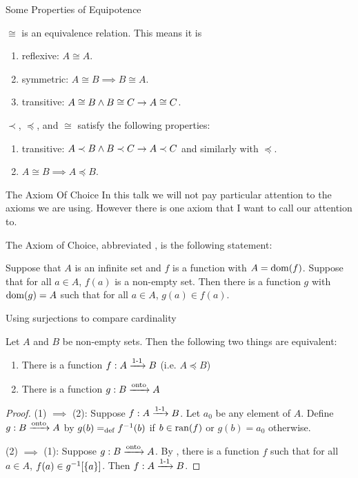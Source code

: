 \documentclass[pdf,final]{prosper}
\newcommand{\skipsmall}{\vspace{1em}}
\newcommand{\skipmed}{\vspace{2em}}
\begin{document}
\begin{slide}{Some Properties of Equipotence}
\begin{exercise}
$\cong$ is an equivalence relation. This means it is
\begin{enumerate}
  \item reflexive: $A\cong A$.
  \item symmetric: $A\cong B\implies B\cong A$.
  \item transitive: $A\cong B \wedge B\cong C \rightarrow A\cong C$.
\end{enumerate}
\end{exercise}

\skipmed

\begin{exercise}
$\prec$, $\preceq$, and $\cong$ satisfy the following properties:
\begin{enumerate}
  \item transitive: $A\prec B \wedge B\prec C \rightarrow A\prec C$ and similarly with
  $\preceq$.
  \item $A\cong B \implies A\preceq B$.
\end{enumerate}
\end{exercise}
\end{slide}

\begin{slide}{The Axiom Of Choice}
In this talk we will not pay particular attention to the axioms we are using.
However there is one axiom that I want to call our attention to.

\skipmed

The Axiom of Choice, abbreviated \AC, is the following statement:

\skipsmall

Suppose that $A$ is an infinite set and $f$ is a function with $A=\operatorname{dom}(f)$.
Suppose that for all $a\in A$, $f(a)$ is a non-empty set. Then there is a
function $g$ with $\operatorname{dom}(g)=A$ such that for all $a \in A$,  $g(a)\in f(a)$.
\end{slide}

\begin{slide}{Using surjections to compare cardinality}
\begin{lemma}
Let $A$ and $B$ be non-empty sets. Then the following two things are equivalent:
\begin{enumerate}
\item There is a function $f:A \xrightarrow{\text{1-1}} B$ (i.e. $A\preceq B$)
\item There is a function $g:B \xrightarrow{\text{onto}} A$
\end{enumerate}
\end{lemma}

\skipsmall

\begin{proof}
(1) $\implies$ (2): Suppose $f:A \xrightarrow{\text{1-1}} B$. Let $a_0$ be any element of $A$.
Define $g:B\xrightarrow{\text{onto}} A$ by $g(b)=_{\text{def}} f^{-1}(b)$ if $b\in\operatorname{ran}(f)$ or
$g(b)=a_0$ otherwise.

(2) $\implies$ (1): Suppose $g:B \xrightarrow{\text{onto}} A$. By \AC, there
is a function $f$ such that for all $a\in A$, $f(a)\in g^{-1}[\left\{a\right\}]$.
Then $f:A \xrightarrow{\text{1-1}} B$.
\end{proof}
\end{slide}
\end{document}
